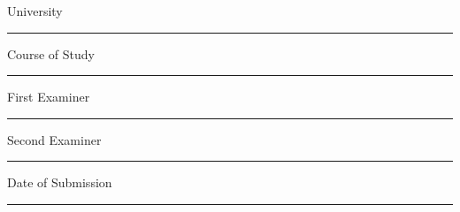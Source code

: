 {\begin{titlepage}
			\begingroup
			\fontsize{8pt}{6pt}\selectfont
			University
			\endgroup

			\vskip -0.15cm

			\begingroup
			\fontsize{12pt}{14pt}\selectfont
				{\@university}
			\endgroup
			\vskip -0.15cm

			\noindent\rule{15cm}{0.4pt}
			
			\vskip 0.05cm

			\begingroup
			\fontsize{8pt}{6pt}\selectfont
			Course of Study
			\endgroup

			\vskip -0.15cm

			\begingroup
			\fontsize{12pt}{14pt}\selectfont
				{\@courseOfStudies}
			\endgroup
			\vskip -0.15cm

			\noindent\rule{15cm}{0.4pt}
			
			\vskip 0.05cm

			\begingroup
			\fontsize{8pt}{6pt}\selectfont
			First Examiner
			\endgroup

			\vskip -0.15cm

			\begingroup
			\fontsize{12pt}{14pt}\selectfont
				{\@firstExaminer}
			\endgroup
			\vskip -0.15cm

			\noindent\rule{15cm}{0.4pt}
			
			\vskip 0.05cm

			\begingroup
			\fontsize{8pt}{6pt}\selectfont
			Second Examiner
			\endgroup

			\vskip -0.15cm

			\begingroup
			\fontsize{12pt}{14pt}\selectfont
				{\@secondExaminer}
			\endgroup
			\vskip -0.15cm

			\noindent\rule{15cm}{0.4pt}
			
			\vskip 0.05cm

			\begingroup
			\fontsize{8pt}{6pt}\selectfont
			Date of Submission
			\endgroup

			\vskip -0.15cm

			\begingroup
			\fontsize{12pt}{14pt}\selectfont
				{\@submitDate}
			\endgroup
			\vskip -0.15cm

			\noindent\rule{15cm}{0.4pt}
		\restoregeometry
	\end{titlepage}
}
\makeatother
